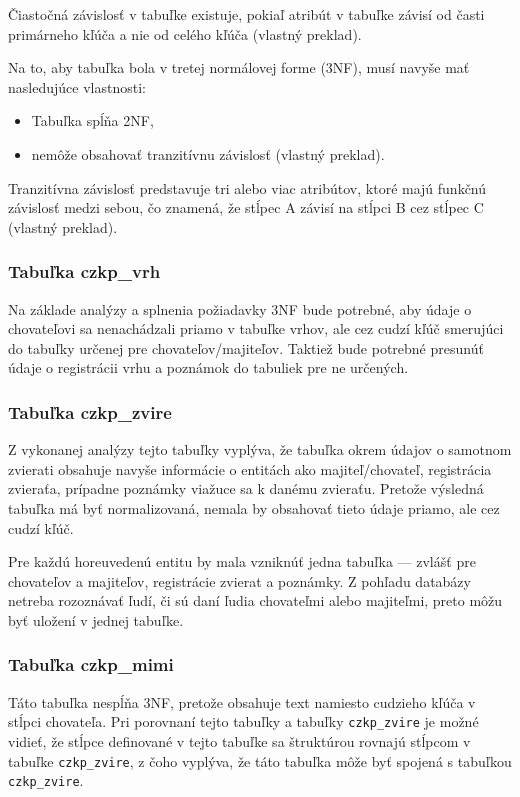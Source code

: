 Čiastočná závislosť v tabuľke existuje, pokiaľ atribút v tabuľke závisí od časti primárneho kľúča a nie od celého kľúča \cite{ciastocna-zavislost} (vlastný preklad). 

\pagebreak

Na to, aby tabuľka bola v tretej normálovej forme (3NF), musí navyše mať nasledujúce vlastnosti:
\begin{itemize}
	\item Tabuľka spĺňa 2NF,
	\item nemôže obsahovať tranzitívnu závislosť \cite{typy-normalizacie} (vlastný preklad).
\end{itemize}

Tranzitívna závislosť predstavuje tri alebo viac atribútov, ktoré majú funkčnú závislosť medzi sebou, čo znamená, že stĺpec A závisí na stĺpci B cez stĺpec C \cite{tranzitivna-zavislost} (vlastný preklad).

\subsubsection{Tabuľka czkp\_vrh}
Na základe analýzy a splnenia požiadavky 3NF bude potrebné, aby údaje o chovateľovi sa nenachádzali priamo v tabuľke vrhov, ale cez cudzí kľúč smerujúci do tabuľky určenej pre chovateľov/majiteľov.
Taktiež bude potrebné presunúť údaje o registrácii vrhu a poznámok do tabuliek pre ne určených.

\subsubsection{Tabuľka czkp\_zvire}
Z vykonanej analýzy tejto tabuľky vyplýva, že tabuľka okrem údajov o samotnom zvierati obsahuje navyše informácie o entitách ako majiteľ/chovateľ, registrácia zvieraťa, prípadne poznámky viažuce sa k danému zvieraťu. Pretože výsledná tabuľka má byť normalizovaná, nemala by obsahovať tieto údaje priamo, ale cez cudzí kľúč.

Pre každú horeuvedenú entitu by mala vzniknúť jedna tabuľka --- zvlášť pre chovateľov a majiteľov, registrácie zvierat a poznámky. Z pohľadu databázy netreba rozoznávať ľudí, či sú daní ľudia chovateľmi alebo majiteľmi, preto môžu byť uložení v jednej tabuľke.

\subsubsection{Tabuľka czkp\_mimi}
Táto tabuľka nespĺňa 3NF, pretože obsahuje text namiesto cudzieho kľúča v stĺpci chovateľa.
Pri porovnaní tejto tabuľky a tabuľky \texttt{czkp_zvire} je možné vidieť, že stĺpce definované v tejto tabuľke sa štruktúrou rovnajú stĺpcom v tabuľke \texttt{czkp_zvire}, z čoho vyplýva, že táto tabuľka môže byť spojená s tabuľkou \texttt{czkp_zvire}.

